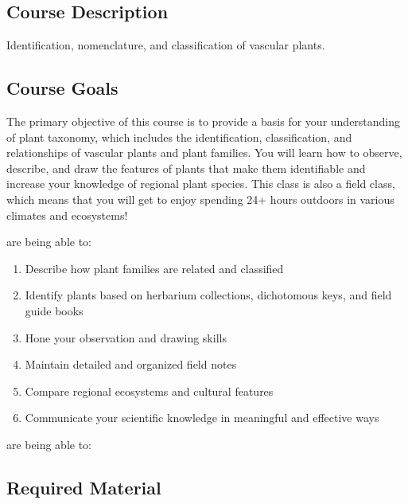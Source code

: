 \documentclass{tufte-handout}
\begin{document}
\begin{fullwidth}

\section{Course Description}

Identification, nomenclature, and classification of vascular plants. 

\subsection{Course Goals}

The primary objective of this course is to provide a basis for your understanding of plant taxonomy, which includes the identification, classification, and relationships of vascular plants and plant families. You will learn how to observe, describe, and draw the features of plants that make them identifiable and increase your knowledge of regional plant species. This class is also a field class, which means that you will get to enjoy spending 24+ hours outdoors in various climates and ecosystems!

 are being able to:

\begin{enumerate}
	\item Describe how plant families are related and classified
	\item Identify plants based on herbarium collections, dichotomous keys, and field guide books
	\item Hone your observation and drawing skills
	\item Maintain detailed and organized field notes
	\item Compare regional ecosystems and cultural features
	\item Communicate your scientific knowledge in meaningful and effective ways
\end{enumerate}

 are being able to: 

\vspace{1.5cm}

\subsection{Required Material}


\end{fullwidth}
\end{document}
